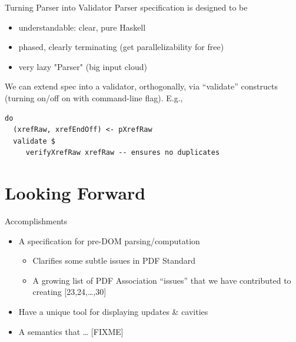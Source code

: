 \documentclass[t,10pt,xcolor={dvipsnames}]{beamer}
\begin{document}
\begin{frame}[label={sec:org7d2dbef},fragile]{Turning Parser into Validator}
 Parser specification is designed to be
\begin{itemize}
\item understandable: clear, pure Haskell
\item phased, clearly terminating (get parallelizability for free)
\item very lazy "Parser" (big input cloud)
\end{itemize}

We can extend spec into a validator, orthogonally, via “validate” constructs
(turning on/off on with command-line flag).  E.g.,
\lstset{language=haskell,label= ,caption= ,captionpos=b,numbers=none}
\begin{lstlisting}
do
  (xrefRaw, xrefEndOff) <- pXrefRaw
  validate $
     verifyXrefRaw xrefRaw -- ensures no duplicates
\end{lstlisting}
\end{frame}

\section{Looking Forward}
\label{sec:org23bf629}
\begin{frame}[label={sec:org06880f5}]{Accomplishments}
\begin{itemize}
\item A specification for pre-DOM parsing/computation
\begin{itemize}
\item Clarifies some subtle issues in PDF Standard
\item A growing list of PDF Association “issues” that we have contributed to
creating [23,24,\ldots{},30]
\end{itemize}
\item Have a unique tool for displaying updates \& cavities
\item A semantics that \ldots{} [FIXME]
\end{itemize}
\end{frame}
\end{document}
